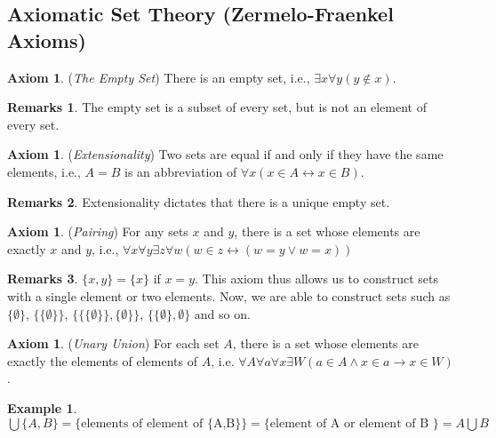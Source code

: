 \documentclass[14pt]{article}
\theoremstyle{definition}
\newtheorem*{remark}{Remarks}
\newtheorem*{example}{Example}
\newtheorem{axiom}[definition]{Axiom}
\begin{document}
\subsection{Axiomatic Set Theory (Zermelo-Fraenkel Axioms)}
\begin{axiom}
    (\textit{The Empty Set}) There is an empty set, i.e., $\exists x \forall y(y\notin x)$.
\end{axiom}
\begin{remark}
    The empty set is a subset of every set, but is not an element of every set.
\end{remark}

\vspace{2mm}

\begin{axiom}
    (\textit{Extensionality}) Two sets are equal if and only if they have the same elements, i.e., $A=B$ is an abbreviation of $\forall x(x\in A \leftrightarrow x\in B )$.
\end{axiom}
\begin{remark}
    Extensionality dictates that there is a unique empty set.
\end{remark}

\vspace{2mm}

\begin{axiom}
    (\textit{Pairing}) For any sets $x$ and $y$, there is a set whose elements are exactly $x$ and $y$, i.e.,  $\forall x\forall y\exists z\forall w(w\in z \leftrightarrow (w=y\lor w=x))$
\end{axiom}
\begin{remark}
    $\lbrace x,y \rbrace =\lbrace x\rbrace$ if $x=y$. This axiom thus allows us to construct sets with a single element or two elements. Now, we are able to construct sets such as $\{\emptyset\}$, $\big\{ \{\emptyset\}\big\}$, $\Big\{\big\{ \{\emptyset\}\big\}, \{\emptyset\}\Big\}$, $\big\{\{\emptyset\}, \emptyset\big\}$ and so on.
\end{remark}

\vspace{2mm}

\begin{axiom}
    (\textit{Unary Union}) For each set $A$, there is a set whose elements are exactly the elements of elements of $A$, i.e.  $\forall A\forall a\forall x\exists W(a\in A \land x\in a \rightarrow x\in W)$.
\end{axiom}

\begin{example}
    $\bigcup\{A,B\}=\big\{ \text{elements of element of \{A,B\} }\big\}=\big\{ \text{element of A or element of B }\big\}=A\bigcup B$
\end{example}
\end{document}
